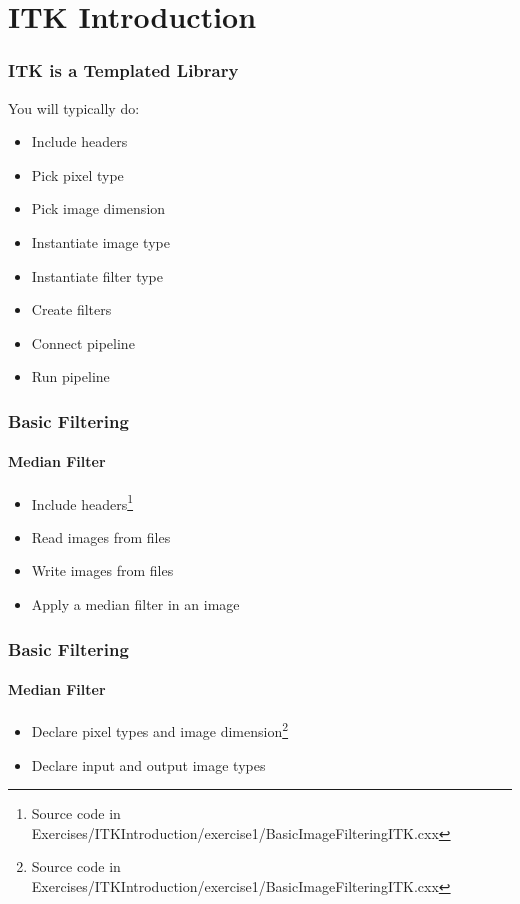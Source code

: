 \section{ITK Introduction}



\begin{frame}
\frametitle{ITK is a Templated Library}
You will typically do:
\begin{itemize}
\item Include headers
\pause
\item Pick pixel type
\pause
\item Pick image dimension
\pause
\item Instantiate image type
\pause
\item Instantiate filter type
\pause
\item Create filters
\pause
\item Connect pipeline
\pause
\item Run pipeline
\end{itemize}
\end{frame}

{
\begin{frame}[fragile]
\frametitle{Basic Filtering}
\framesubtitle{Median Filter}
\begin{itemize}
\item Include headers\footnote{Source code in Exercises/ITKIntroduction/exercise1/BasicImageFilteringITK.cxx}
\end{itemize}
\pause
\begin{itemize}
\item Read images from files
\item Write images from files
\item Apply a median filter in an image
\end{itemize}
\end{frame}
}

{
\begin{frame}[fragile]
\frametitle{Basic Filtering}
\framesubtitle{Median Filter}
\begin{itemize}
\item Declare pixel types and image dimension\footnote{Source code in Exercises/ITKIntroduction/exercise1/BasicImageFilteringITK.cxx}
\end{itemize}
\begin{center}
\end{center}
\pause
\begin{itemize}
\item Declare input and output image types
\end{itemize}
\begin{center}
\end{center}
\end{frame}
}

